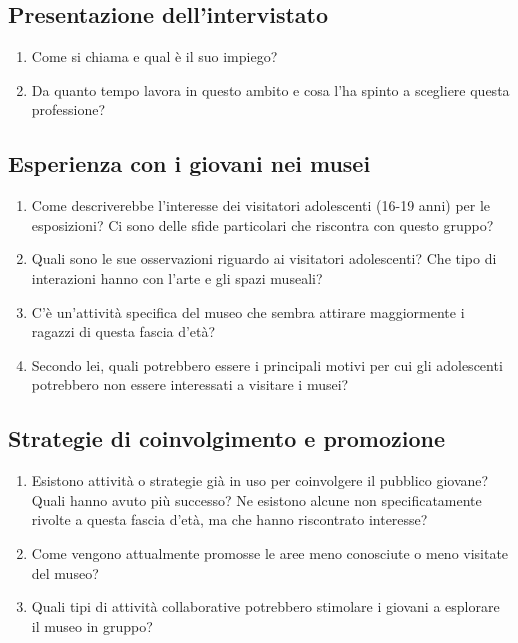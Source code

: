 \documentclass[a4paper, 12pt]{article}
\begin{document}
\subsection{\textcolor{subsectioncolor}{Presentazione dell'intervistato }}
\begin{enumerate}[label=\textcolor{textcolor}{\arabic*.}]
    \item \textcolor{textcolor}{Come si chiama e qual è il suo impiego?}
    \item \textcolor{textcolor}{Da quanto tempo lavora in questo ambito e cosa l'ha spinto a scegliere questa professione?}
\end{enumerate}

\subsection{\textcolor{subsectioncolor}{Esperienza con i giovani nei musei}}
\begin{enumerate}[label=\textcolor{textcolor}{\arabic*.}]
    \item \textcolor{textcolor}{Come descriverebbe l'interesse dei visitatori adolescenti (16-19 anni) per le esposizioni? Ci sono delle sfide particolari che riscontra con questo gruppo?}
    \item \textcolor{textcolor}{Quali sono le sue osservazioni riguardo ai visitatori adolescenti? Che tipo di interazioni hanno con l'arte e gli spazi museali?}
    \item \textcolor{textcolor}{C'è un'attività specifica del museo che sembra attirare maggiormente i ragazzi di questa fascia d'età?}
    \item Secondo lei, quali potrebbero essere i principali motivi per cui gli adolescenti potrebbero non essere interessati a visitare i musei?
\end{enumerate}


\subsection{\textcolor{subsectioncolor}{Strategie di coinvolgimento e promozione}}

\begin{enumerate}
    \item Esistono attività o strategie già in uso per coinvolgere il pubblico giovane? Quali hanno avuto più successo? Ne esistono alcune non specificatamente rivolte a questa fascia d’età, ma che hanno riscontrato interesse?
    \item Come vengono attualmente promosse le aree meno conosciute o meno visitate del museo?
    \item Quali tipi di attività collaborative potrebbero stimolare i giovani a esplorare il museo in gruppo?
\end{enumerate}
\end{document}
